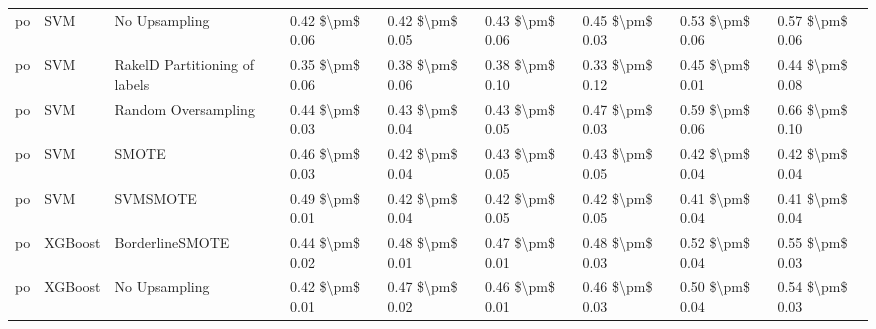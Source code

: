 \begin{tabular}{lllllllll}
      po &                             SVM &                 No Upsampling &     0.42 \$\textbackslash pm\$ 0.06 &           0.42 \$\textbackslash pm\$ 0.05 &       0.43 \$\textbackslash pm\$ 0.06 &        0.45 \$\textbackslash pm\$ 0.03 &                         0.53 \$\textbackslash pm\$ 0.06 &     0.57 \$\textbackslash pm\$ 0.06 \\
      po &                             SVM & RakelD Partitioning of labels &     0.35 \$\textbackslash pm\$ 0.06 &           0.38 \$\textbackslash pm\$ 0.06 &       0.38 \$\textbackslash pm\$ 0.10 &        0.33 \$\textbackslash pm\$ 0.12 &                         0.45 \$\textbackslash pm\$ 0.01 &     0.44 \$\textbackslash pm\$ 0.08 \\
      po &                             SVM &           Random Oversampling &     0.44 \$\textbackslash pm\$ 0.03 &           0.43 \$\textbackslash pm\$ 0.04 &       0.43 \$\textbackslash pm\$ 0.05 &        0.47 \$\textbackslash pm\$ 0.03 &                         0.59 \$\textbackslash pm\$ 0.06 &     0.66 \$\textbackslash pm\$ 0.10 \\
      po &                             SVM &                         SMOTE &     0.46 \$\textbackslash pm\$ 0.03 &           0.42 \$\textbackslash pm\$ 0.04 &       0.43 \$\textbackslash pm\$ 0.05 &        0.43 \$\textbackslash pm\$ 0.05 &                         0.42 \$\textbackslash pm\$ 0.04 &     0.42 \$\textbackslash pm\$ 0.04 \\
      po &                             SVM &                      SVMSMOTE &     0.49 \$\textbackslash pm\$ 0.01 &           0.42 \$\textbackslash pm\$ 0.04 &       0.42 \$\textbackslash pm\$ 0.05 &        0.42 \$\textbackslash pm\$ 0.05 &                         0.41 \$\textbackslash pm\$ 0.04 &     0.41 \$\textbackslash pm\$ 0.04 \\
      po &                         XGBoost &               BorderlineSMOTE &     0.44 \$\textbackslash pm\$ 0.02 &           0.48 \$\textbackslash pm\$ 0.01 &       0.47 \$\textbackslash pm\$ 0.01 &        0.48 \$\textbackslash pm\$ 0.03 &                         0.52 \$\textbackslash pm\$ 0.04 &     0.55 \$\textbackslash pm\$ 0.03 \\
      po &                         XGBoost &                 No Upsampling &     0.42 \$\textbackslash pm\$ 0.01 &           0.47 \$\textbackslash pm\$ 0.02 &       0.46 \$\textbackslash pm\$ 0.01 &        0.46 \$\textbackslash pm\$ 0.03 &                         0.50 \$\textbackslash pm\$ 0.04 &     0.54 \$\textbackslash pm\$ 0.03 \\

\end{tabular}
